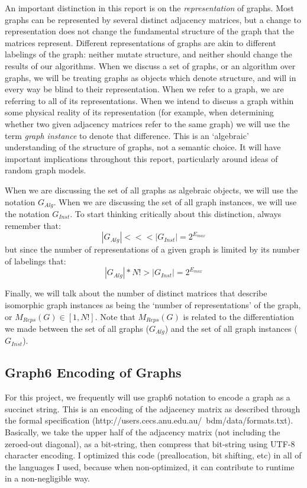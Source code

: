 An important distinction in this report is on the \emph{representation} of graphs.
Most graphs can be represented by several distinct adjacency matrices, but a change to representation does not change the fundamental structure of the graph that the matrices represent.
Different representations of graphs are akin to different labelings of the graph: neither mutate structure, and neither should change the results of our algorithms.
When we discuss a set of graphs, or an algorithm over graphs, we will be treating graphs as objects which denote structure, and will in every way be blind to their representation.
When we refer to a graph, we are referring to all of its representations.
When we intend to discuss a graph within some physical reality of its representation (for example, when determining whether two given adjacency matrices refer to the same graph) we will use the term \emph{graph instance} to denote that difference.
This is an `algebraic' understanding of the structure of graphs, not a semantic choice. 
It will have important implications throughout this report, particularly around ideas of random graph models.

When we are discussing the set of all graphs as algebraic objects, we will use the notation $G_{Alg}$.
When we are discussing the set of all graph instances, we will use the notation $G_{Inst}$.
To start thinking critically about this distinction, always remember that:
$$|G_{Alg}| <<< |G_{Inst}| = 2^{E_{max}}$$
but since the number of representations of a given graph is limited by its number of labelings that:
$$|G_{Alg}| * N! > | G_{Inst} | =  2^{E_{max}}$$

Finally, we will talk about the number of distinct matrices that describe isomorphic graph instances as being the `number of representations' of the graph, or $M_{Reps}(G) \in [1, N!]$.
Note that  $M_{Reps}(G)$ is related to the differentiation we made between the set of all graphs ($G_{Alg}$) and the set of all graph instances ($G_{Inst}$).

\subsection{Graph6 Encoding of Graphs}

For this project, we frequently will use graph6 notation to encode a graph as a succinct string.
This is an encoding of the adjacency matrix as described through the formal specification (http://users.cecs.anu.edu.au/~bdm/data/formats.txt).
Basically, we take the upper half of the adjacency matrix (not including the zeroed-out diagonal), as a bit-string, then compress that bit-string using UTF-8 character encoding.
I optimized this code (preallocation, bit shifting, etc) in all of the languages I used, because when non-optimized, it can contribute to runtime in a non-negligible way.


